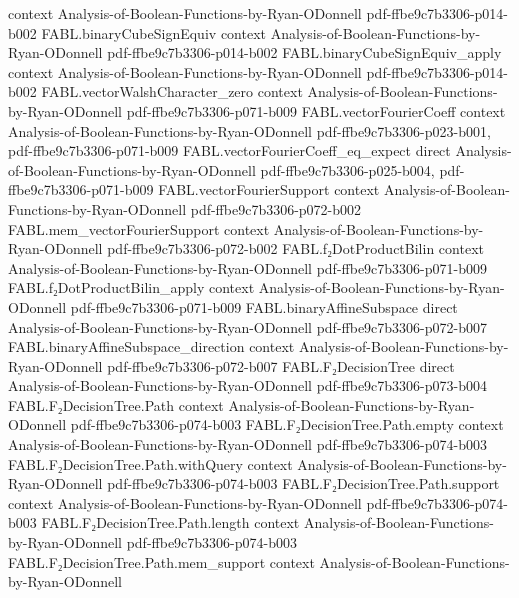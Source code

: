 \begin{theorem}
  {context}
  {Analysis-of-Boolean-Functions-by-Ryan-ODonnell}
  {pdf-ffbe9c7b3306-p014-b002}
\proofstep
  {FABL.binaryCubeSignEquiv}
  {context}
  {Analysis-of-Boolean-Functions-by-Ryan-ODonnell}
  {pdf-ffbe9c7b3306-p014-b002}
\proofstep
  {FABL.binaryCubeSignEquiv_apply}
  {context}
  {Analysis-of-Boolean-Functions-by-Ryan-ODonnell}
  {pdf-ffbe9c7b3306-p014-b002}
\proofstep
  {FABL.vectorWalshCharacter_zero}
  {context}
  {Analysis-of-Boolean-Functions-by-Ryan-ODonnell}
  {pdf-ffbe9c7b3306-p071-b009}
\proofstep
  {FABL.vectorFourierCoeff}
  {context}
  {Analysis-of-Boolean-Functions-by-Ryan-ODonnell}
  {pdf-ffbe9c7b3306-p023-b001,
    pdf-ffbe9c7b3306-p071-b009}
\proofstep
  {FABL.vectorFourierCoeff_eq_expect}
  {direct}
  {Analysis-of-Boolean-Functions-by-Ryan-ODonnell}
  {pdf-ffbe9c7b3306-p025-b004,
    pdf-ffbe9c7b3306-p071-b009}
\proofstep
  {FABL.vectorFourierSupport}
  {context}
  {Analysis-of-Boolean-Functions-by-Ryan-ODonnell}
  {pdf-ffbe9c7b3306-p072-b002}
\proofstep
  {FABL.mem_vectorFourierSupport}
  {context}
  {Analysis-of-Boolean-Functions-by-Ryan-ODonnell}
  {pdf-ffbe9c7b3306-p072-b002}
\proofstep
  {FABL.f₂DotProductBilin}
  {context}
  {Analysis-of-Boolean-Functions-by-Ryan-ODonnell}
  {pdf-ffbe9c7b3306-p071-b009}
\proofstep
  {FABL.f₂DotProductBilin_apply}
  {context}
  {Analysis-of-Boolean-Functions-by-Ryan-ODonnell}
  {pdf-ffbe9c7b3306-p071-b009}
\proofstep
  {FABL.binaryAffineSubspace}
  {direct}
  {Analysis-of-Boolean-Functions-by-Ryan-ODonnell}
  {pdf-ffbe9c7b3306-p072-b007}
\proofstep
  {FABL.binaryAffineSubspace_direction}
  {context}
  {Analysis-of-Boolean-Functions-by-Ryan-ODonnell}
  {pdf-ffbe9c7b3306-p072-b007}
\proofstep
  {FABL.F₂DecisionTree}
  {direct}
  {Analysis-of-Boolean-Functions-by-Ryan-ODonnell}
  {pdf-ffbe9c7b3306-p073-b004}
\proofstep
  {FABL.F₂DecisionTree.Path}
  {context}
  {Analysis-of-Boolean-Functions-by-Ryan-ODonnell}
  {pdf-ffbe9c7b3306-p074-b003}
\proofstep
  {FABL.F₂DecisionTree.Path.empty}
  {context}
  {Analysis-of-Boolean-Functions-by-Ryan-ODonnell}
  {pdf-ffbe9c7b3306-p074-b003}
\proofstep
  {FABL.F₂DecisionTree.Path.withQuery}
  {context}
  {Analysis-of-Boolean-Functions-by-Ryan-ODonnell}
  {pdf-ffbe9c7b3306-p074-b003}
\proofstep
  {FABL.F₂DecisionTree.Path.support}
  {context}
  {Analysis-of-Boolean-Functions-by-Ryan-ODonnell}
  {pdf-ffbe9c7b3306-p074-b003}
\proofstep
  {FABL.F₂DecisionTree.Path.length}
  {context}
  {Analysis-of-Boolean-Functions-by-Ryan-ODonnell}
  {pdf-ffbe9c7b3306-p074-b003}
\proofstep
  {FABL.F₂DecisionTree.Path.mem_support}
  {context}
  {Analysis-of-Boolean-Functions-by-Ryan-ODonnell}

\end{theorem}
